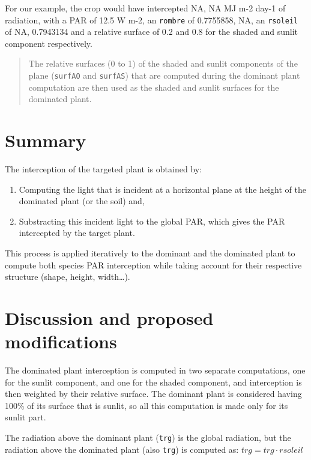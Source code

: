 \documentclass[]{book}
\providecommand{\tightlist}{%
  \setlength{\itemsep}{0pt}\setlength{\parskip}{0pt}}
\theoremstyle{definition}
\theoremstyle{definition}
\theoremstyle{definition}
\theoremstyle{remark}
\begin{document}
For our example, the crop would have intercepted NA, NA MJ m-2 day-1 of
radiation, with a PAR of 12.5 W m-2, an \texttt{rombre} of 0.7755858,
NA, an \texttt{rsoleil} of NA, 0.7943134 and a relative surface of 0.2
and 0.8 for the shaded and sunlit component respectively.

\begin{quote}
The relative surfaces (0 to 1) of the shaded and sunlit components of
the plane (\texttt{surfAO} and \texttt{surfAS}) that are computed during
the dominant plant computation are then used as the shaded and sunlit
surfaces for the dominated plant.
\end{quote}

\section{Summary}\label{summary}

The interception of the targeted plant is obtained by:

\begin{enumerate}
\def\labelenumi{\arabic{enumi}.}
\tightlist
\item
  Computing the light that is incident at a horizontal plane at the
  height of the dominated plant (or the soil) and,
\item
  Substracting this incident light to the global PAR, which gives the
  PAR intercepted by the target plant.
\end{enumerate}

This process is applied iteratively to the dominant and the dominated
plant to compute both species PAR interception while taking account for
their respective structure (shape, height, width\ldots{}).

\section{Discussion and proposed
modifications}\label{discussion-and-proposed-modifications}

The dominated plant interception is computed in two separate
computations, one for the sunlit component, and one for the shaded
component, and interception is then weighted by their relative surface.
The dominant plant is considered having 100\% of its surface that is
sunlit, so all this computation is made only for its sunlit part.

The radiation above the dominant plant (\texttt{trg}) is the global
radiation, but the radiation above the dominated plant (also
\texttt{trg}) is computed as: \(trg=trg\cdot rsoleil\)
\end{document}
